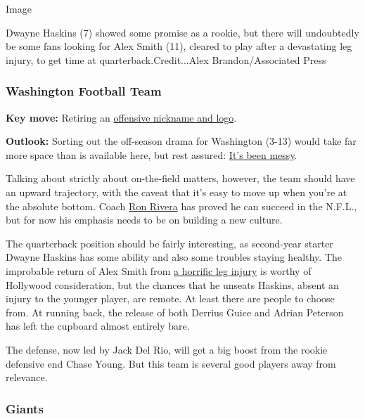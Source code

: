 Image

Dwayne Haskins (7) showed some promise as a rookie, but there will
undoubtedly be some fans looking for Alex Smith (11), cleared to play
after a devastating leg injury, to get time at quarterback.Credit...Alex
Brandon/Associated Press

\hypertarget{washington-football-team}{%
\subsubsection{\texorpdfstring{\textbf{Washington Football
Team}}{Washington Football Team}}\label{washington-football-team}}

\textbf{Key move:} Retiring an
\href{https://www.nytimes3xbfgragh.onion/2020/07/13/sports/football/native-american-washington-name-change.html}{offensive
nickname and logo}.

\textbf{Outlook:} Sorting out the off-season drama for Washington (3-13)
would take far more space than is available here, but rest assured:
\href{https://www.nytimes3xbfgragh.onion/2020/08/24/sports/football/dan-snyder-washington-football-ownership.html}{It's
been messy}.

Talking about strictly about on-the-field matters, however, the team
should have an upward trajectory, with the caveat that it's easy to move
up when you're at the absolute bottom. Coach
\href{https://www.nytimes3xbfgragh.onion/2020/08/20/sports/football/washington-football-ron-rivera-cancer.html}{Ron
Rivera} has proved he can succeed in the N.F.L., but for now his
emphasis needs to be on building a new culture.

The quarterback position should be fairly interesting, as second-year
starter Dwayne Haskins has some ability and also some troubles staying
healthy. The improbable return of Alex Smith from
\href{https://www.espn.com/nfl/story/_/id/29671320/washington-qb-alex-smith-cleared-football-activity-team}{a
horrific leg injury} is worthy of Hollywood consideration, but the
chances that he unseats Haskins, absent an injury to the younger player,
are remote. At least there are people to choose from. At running back,
the release of both Derrius Guice and Adrian Peterson has left the
cupboard almost entirely bare.

The defense, now led by Jack Del Rio, will get a big boost from the
rookie defensive end Chase Young. But this team is several good players
away from relevance.

\hypertarget{giants}{%
\subsubsection{\texorpdfstring{\textbf{Giants}}{Giants}}\label{giants}}

